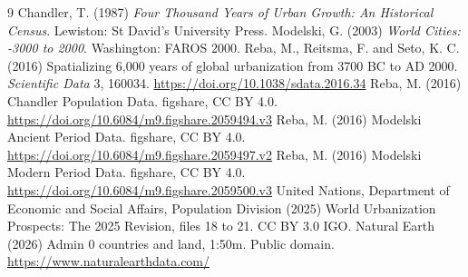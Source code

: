 \documentclass[11pt,a4paper]{article}
\begin{document}
\begin{thebibliography}{9}
 Chandler, T. (1987) \textit{Four Thousand Years of Urban Growth: An Historical Census}. Lewiston: St David's University Press.
 Modelski, G. (2003) \textit{World Cities: -3000 to 2000}. Washington: FAROS 2000.
 Reba, M., Reitsma, F. and Seto, K. C. (2016) Spatializing 6,000 years of global urbanization from 3700 BC to AD 2000. \textit{Scientific Data} 3, 160034. \url{https://doi.org/10.1038/sdata.2016.34}
 Reba, M. (2016) Chandler Population Data. figshare, CC BY 4.0. \url{https://doi.org/10.6084/m9.figshare.2059494.v3}
 Reba, M. (2016) Modelski Ancient Period Data. figshare, CC BY 4.0. \url{https://doi.org/10.6084/m9.figshare.2059497.v2}
 Reba, M. (2016) Modelski Modern Period Data. figshare, CC BY 4.0. \url{https://doi.org/10.6084/m9.figshare.2059500.v3}
 United Nations, Department of Economic and Social Affairs, Population Division (2025) World Urbanization Prospects: The 2025 Revision, files 18 to 21. CC BY 3.0 IGO.
 Natural Earth (2026) Admin 0 countries and land, 1:50m. Public domain. \url{https://www.naturalearthdata.com/}
\end{thebibliography}
\end{document}
